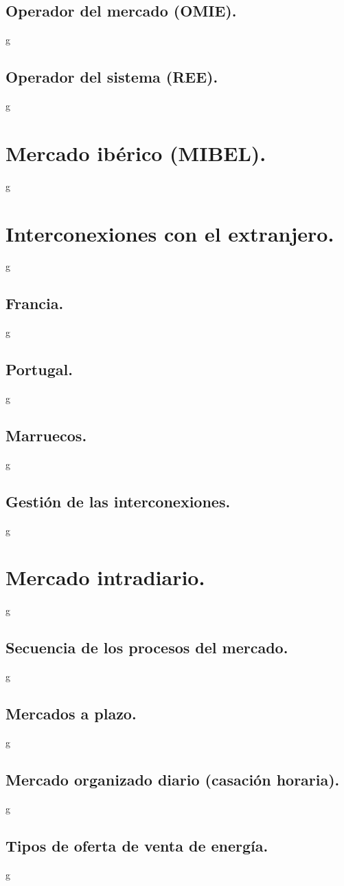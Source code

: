 \subsection{Operador del mercado (OMIE).}
g
\subsection{Operador del sistema (REE).}
g
\section{Mercado ibérico (MIBEL).}
g
\section{Interconexiones con el extranjero.}
g
\subsection{Francia.}
g
\subsection{Portugal.}
g
\subsection{Marruecos.}
g
\subsection{Gestión de las interconexiones.}
g
\section{Mercado intradiario.}
g
\subsection{Secuencia de los procesos del mercado.}
g
\subsection{Mercados a plazo.}
g
\subsection{Mercado organizado diario (casación horaria).}
g
\subsection{Tipos de oferta de venta de energía.}
g
